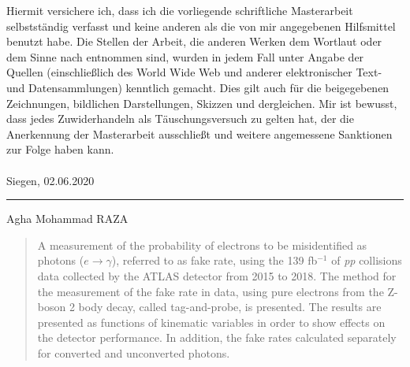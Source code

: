 \documentclass[
12pt, %
english, %
singlespacing, %
headsepline, %
]{MastersDoctoralThesis} %
\begin{document}

\begin{declaration}
\addchaptertocentry{\authorshipname} %
\noindent Hiermit versichere ich, dass ich die vorliegende schriftliche Masterarbeit selbstständig verfasst und keine anderen als die von mir angegebenen Hilfsmittel benutzt habe. Die Stellen der Arbeit, die anderen Werken dem Wortlaut oder dem Sinne nach entnommen sind, wurden in jedem Fall unter Angabe der Quellen (einschließlich des World Wide Web und anderer elektronischer Text- und Datensammlungen) kenntlich gemacht. Dies gilt auch für die beigegebenen Zeichnungen, bildlichen Darstellungen, Skizzen und dergleichen. Mir ist bewusst, dass jedes Zuwiderhandeln als Täuschungsversuch zu gelten hat, der die Anerkennung der Masterarbeit ausschließt und weitere angemessene Sanktionen zur Folge haben kann. \\
\\ 
\noindent Siegen, 02.06.2020\\
\rule[2em]{25em}{0.5pt} %
 
\noindent Agha Mohammad RAZA\\
\end{declaration}

\cleardoublepage



\begin{abstract}
\addchaptertocentry{\abstractname} %
A measurement of the probability of electrons to be misidentified as photons ($e\rightarrow\gamma$), referred to as fake rate, using the 139 fb$^{-1}$ of \textit{pp} collisions data collected by the ATLAS detector from 2015 to 2018. The method for the measurement of the fake rate in data, using pure electrons from the Z-boson 2 body decay, called tag-and-probe, is presented. The results are presented as functions of kinematic variables in order to show effects on the detector performance. In addition, the fake rates calculated separately for converted and unconverted photons.
\end{abstract}
\end{document}
